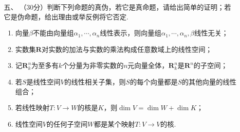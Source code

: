 \begin{enumerate}
\begin{enumerate}[label=(\arabic*)]
    \end{enumerate}
	\item[五、]（30分）判断下列命题的真伪，若它是真命题，请给出简单的证明；若它是伪命题，给出理由或举反例将它否定.
    \begin{enumerate}[label=(\arabic*)]
        \item 向量$\beta$不能由向量组$\alpha_1,\cdots,\alpha_n$线性表示，则向量组$\alpha_1,\cdots,\alpha_n,\beta$线性无关；
        \item 实数集$\mathbf{R}$对实数的加法与实数的乘法构成任意数域上的线性空间；
        \item 记$\mathbf{R}_k^n$为至多有$k$个分量为非零实数的$n$元向量全体，$\mathbf{R}_k^n$是$\mathbf{R}^n$的子空间；
        \item 若$S$是线性空间$V$的线性相关子集，则$S$的每个向量都是$S$的其他向量的线性组合；
        \item 若线性映射$T:V\to W$的核是$K$，则$\dim V=\dim W+\dim K$；
        \item 线性空间$V$的任何子空间$W$都是某个映射$T:V\to V$的核.
    \end{enumerate}
\end{enumerate}

\newpage
